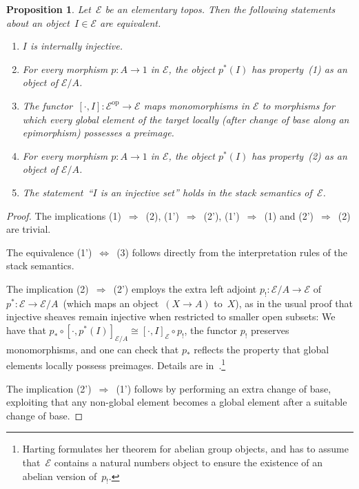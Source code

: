 \documentclass[oneside]{amsart}
\theoremstyle{definition}
\theoremstyle{plain}
\newtheorem{prop}[defn]{Proposition}
\theoremstyle{remark}
\newcommand{\E}{\mathcal{E}}
\newcommand{\op}{\mathrm{op}}
\renewcommand{\_}{\mathpunct{.}\,}
\begin{document}
\begin{prop}\label{prop:notions-of-internal-injectivity}
Let~$\E$ be an elementary topos. Then the following statements about an
object~$I \in \E$ are equivalent.
\begin{enumerate}
\item[(1)] $I$ is internally injective.
\item[(1')] For every morphism $p : A \to 1$ in $\E$, the object $p^*(I)$ has property~(1)
as an object of $\E/A$.
\item[(2)] The functor~$[\cdot, I] : \E^\op \to \E$ maps monomorphisms in $\E$
to morphisms for which every global element of the target locally (after change of
base along an epimorphism) possesses a preimage.
\item[(2')] For every morphism $p : A \to 1$ in $\E$, the object $p^*(I)$ has property~(2)
as an object of $\E/A$.
\item[(3)] The statement~``$I$ is an injective set'' holds in the stack
semantics of~$\E$.
\end{enumerate}
\end{prop}

\begin{proof}
The implications (1)~$\Rightarrow$~(2), (1')~$\Rightarrow$~(2'),
(1')~$\Rightarrow$~(1) and (2')~$\Rightarrow$~(2) are trivial.

The equivalence (1')~$\Leftrightarrow$~(3) follows directly from the
interpretation rules of the stack semantics.

The implication (2)~$\Rightarrow$~(2') employs the
extra left adjoint $p_! : \E/A \to \E$ of $p^* : \E
\to \E/A$~(which maps an object~$(X \to A)$ to~$X$), as in the usual proof that
injective sheaves remain injective when
restricted to smaller open subsets: We have that $p_* \circ [\cdot, p^*(I)]_{\E/A}
\cong [\cdot, I]_\E \circ p_!$, the functor $p_!$ preserves monomorphisms, and one
can check that $p_*$ reflects the property that global elements locally possess
preimages. Details are in~\cite[Thm.~1.1]{harting:locally-injective}.\footnote{Harting formulates
her theorem for abelian group objects, and has to assume that~$\E$ contains a
natural numbers object to ensure the existence of an abelian version of~$p_!$.}

The implication (2')~$\Rightarrow$~(1') follows by performing an extra change of
base, exploiting that any non-global element becomes a global element after a suitable
change of base.
\end{proof}
\end{document}
